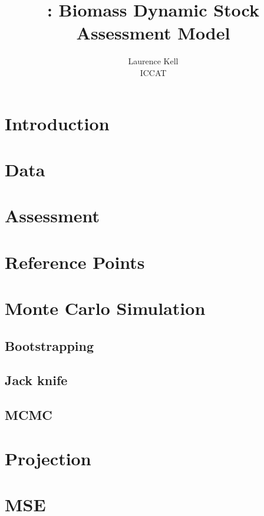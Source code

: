 \documentclass[shortnames,nojss,article]{jss}
\author{Laurence Kell\\ICCAT}
\title{\pkg{ASPIC}: Biomass Dynamic Stock Assessment Model}
\begin{document}


\section{Introduction}


\section{Data}

\section{Assessment}

\section{Reference Points}

\section{Monte Carlo Simulation}
\subsection{Bootstrapping}
\subsection{Jack knife}
\subsection{MCMC}

\section{Projection}

\section{MSE}
\end{document}

